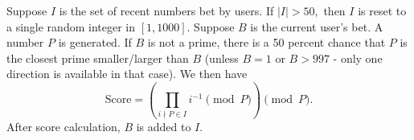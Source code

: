 Suppose $I$ is the set of recent numbers bet by users. If $|I| > 50,$ then $I$ is reset to a single random integer in $[1, 1000].$ Suppose $B$ is the current user's bet. A number $P$ is generated. If $B$ is not a prime, there is a 50 percent chance that $P$ is the closest prime smaller/larger than $B$ (unless $B=1$ or $B > 997$ - only one direction is available in that case). We then have $$\text{Score} = \left( \prod_{i \nmid P \in I} i^{-1} \pmod{P} \right) \pmod{P}.$$ After score calculation, $B$ is added to $I.$

